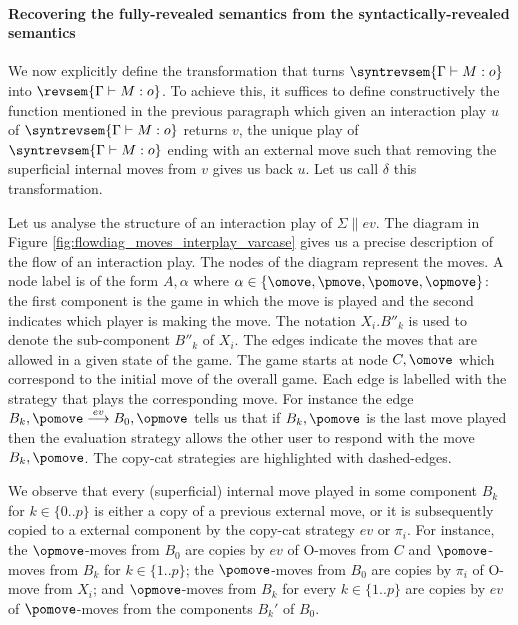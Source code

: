     \paragraph{Recovering the fully-revealed semantics from the syntactically-revealed semantics}


    We now explicitly define the transformation that turns $\syntrevsem{\Gamma \vdash M : o}$ into $\revsem{\Gamma \vdash M : o}$. To achieve this, it suffices to define constructively the function mentioned in the previous paragraph which given an interaction play $u$ of $\syntrevsem{\Gamma \vdash M : o}$ returns $v$, the unique play of $\syntrevsem{\Gamma \vdash M : o}$ ending with an external move such that removing the superficial internal moves from $v$ gives us back $u$. Let us call $\delta$ this transformation.

    Let us analyse the structure of an interaction play of $\Sigma \|  ev$. The diagram in Figure \ref{fig:flowdiag_moves_interplay_varcase} gives us a precise description of the flow of an interaction play. The nodes of the diagram represent the moves. A node label is of the form $A,\alpha$ where $\alpha \in \{\omove,\pmove,\pomove,\opmove\}$: the first component is the game in which the move is played and the second indicates which player is making the move. The notation $X_i.B''_k$ is used to denote the sub-component $B''_k$ of $X_i$. The edges indicate the moves that are allowed in a given state of the game. The game starts at node $C,\omove$ which correspond to the initial move of the overall game. Each edge is labelled with the strategy that plays the corresponding move. For instance the edge $B_k,\pomove \stackrel{ev}\longrightarrow B_0,\opmove$ tells us that if $B_k,\pomove$ is the last move played then the evaluation strategy allows the other user to respond with the move $B_k,\pomove$. The copy-cat strategies are highlighted with dashed-edges.

    We observe that every (superficial) internal move played in some component $B_k$ for $k\in \{0..p\}$ is either a copy of a previous external move, or it is subsequently copied to a external component by the copy-cat strategy $ev$ or $\pi_i$.  For instance, the $\opmove$-moves from $B_0$ are copies by $ev$ of O-moves from $C$ and $\pomove$-moves from $B_k$ for $k \in \{1..p\}$; the $\pomove$-moves from $B_0$ are copies by $\pi_i$ of O-move from $X_i$; and $\opmove$-moves from $B_k$ for every $k \in \{1..p\}$ are copies by $ev$ of $\pomove$-moves from the components $B_k'$ of $B_0$.

